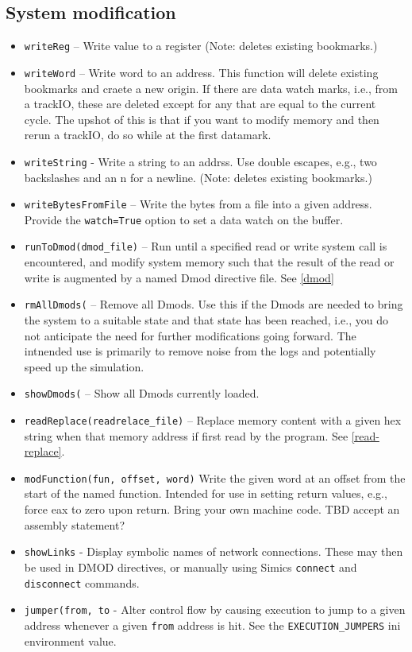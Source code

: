 \documentclass[titlepage]{article}
\begin{document}
\subsection{System modification}
\label{sec:modification}
\begin{itemize}

\item {\tt writeReg} – Write value to a register (Note: deletes existing bookmarks.)
\item {\tt writeWord} – Write word to an address. This function will delete existing bookmarks and craete a new origin.  If there are data watch marks,
i.e., from a trackIO, these are deleted except for any that are equal to the current cycle.  The upshot of this is that if you want to modify memory
and then rerun a trackIO, do so while at the first datamark.
\item {\tt writeString} - Write a string to an addrss. Use double escapes, e.g., two backslashes and an n for a newline. (Note: deletes existing bookmarks.)
\item {\tt writeBytesFromFile} – Write the bytes from a file into a given address.  Provide the {\tt watch=True} option to set a data watch on the buffer.

\item {\tt runToDmod(dmod\_file)} – Run until a specified read or write system call is encountered, and modify system memory such
that the result of the read or write is augmented by a named Dmod directive file.  See \ref{dmod}

\item {\tt rmAllDmods(} – Remove all Dmods.  Use this if the Dmods are needed to bring the system to a suitable state and that state has been reached, i.e.,
you do not anticipate the need for further modifications going forward.  The intnended use is primarily to remove noise from the logs and potentially speed
up the simulation.

\item {\tt showDmods(} – Show all Dmods currently loaded.

\item {\tt readReplace(readrelace\_file)} – Replace memory content with a given hex string when that memory address if first read by the program.
See \ref{read-replace}.

\item {\tt modFunction(fun, offset, word)} Write the given word at an offset from the start of the named function.  Intended for use in setting return
values, e.g., force eax to zero upon return.  Bring your own machine code.  TBD accept an assembly statement?

\item {\tt showLinks} - Display symbolic names of network connections.  These may then be used in DMOD directives, or manually using Simics {\tt connect}
and {\tt disconnect} commands.

\item {\tt jumper(from, to} - Alter control flow by causing execution to jump to a given address whenever a given {\tt from} address is hit.  See
the {\tt EXECUTION\_JUMPERS} ini environment value.

\end{itemize}
\end{document}
